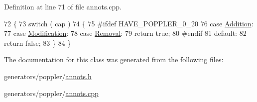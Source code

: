 Definition at line 71 of file annots.\+cpp.


\begin{DoxyCode}
72 \{
73     \textcolor{keywordflow}{switch} ( cap )
74     \{
75 \textcolor{preprocessor}{#ifdef HAVE\_POPPLER\_0\_20}
76         \textcolor{keywordflow}{case} \hyperlink{classOkular_1_1AnnotationProxy_ae89e16435aa7e10ac4089e673f44e543afd5f00fa1edfb9d2043f90f9938cee3a}{Addition}:
77         \textcolor{keywordflow}{case} \hyperlink{classOkular_1_1AnnotationProxy_ae89e16435aa7e10ac4089e673f44e543ac0cea5683bbb000686ad820c6cd885bf}{Modification}:
78         \textcolor{keywordflow}{case} \hyperlink{classOkular_1_1AnnotationProxy_ae89e16435aa7e10ac4089e673f44e543ace001445896cb9742c5282e4fa127936}{Removal}:
79             \textcolor{keywordflow}{return} \textcolor{keyword}{true};
80 \textcolor{preprocessor}{#endif}
81         \textcolor{keywordflow}{default}:
82             \textcolor{keywordflow}{return} \textcolor{keyword}{false};
83     \}
84 \}
\end{DoxyCode}


The documentation for this class was generated from the following files\+:\begin{DoxyCompactItemize}
\item 
generators/poppler/\hyperlink{annots_8h}{annots.\+h}\item 
generators/poppler/\hyperlink{annots_8cpp}{annots.\+cpp}\end{DoxyCompactItemize}

